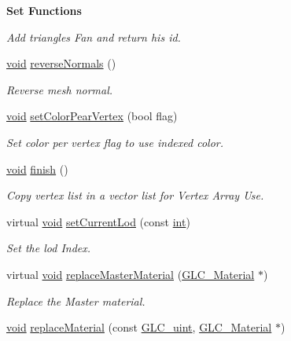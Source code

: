 \begin{Indent}{\bf Set Functions}
\begin{DoxyCompactItemize}
\begin{DoxyCompactList}\small\item\em Add triangles Fan and return his id. \end{DoxyCompactList}\item 
\hyperlink{group___u_a_v_objects_plugin_ga444cf2ff3f0ecbe028adce838d373f5c}{void} \hyperlink{class_g_l_c___mesh_a07f52a193f000496f654b7cecfaf40e9}{reverse\-Normals} ()
\begin{DoxyCompactList}\small\item\em Reverse mesh normal. \end{DoxyCompactList}\item 
\hyperlink{group___u_a_v_objects_plugin_ga444cf2ff3f0ecbe028adce838d373f5c}{void} \hyperlink{class_g_l_c___mesh_a2ddab431b4c0513f9183e74f57a67d25}{set\-Color\-Pear\-Vertex} (bool flag)
\begin{DoxyCompactList}\small\item\em Set color per vertex flag to use indexed color. \end{DoxyCompactList}\item 
\hyperlink{group___u_a_v_objects_plugin_ga444cf2ff3f0ecbe028adce838d373f5c}{void} \hyperlink{class_g_l_c___mesh_a1a542c61d4e0a84222304db9c4768b5b}{finish} ()
\begin{DoxyCompactList}\small\item\em Copy vertex list in a vector list for Vertex Array Use. \end{DoxyCompactList}\item 
virtual \hyperlink{group___u_a_v_objects_plugin_ga444cf2ff3f0ecbe028adce838d373f5c}{void} \hyperlink{class_g_l_c___mesh_ac1faab26c0b7b098bf4e9fa46d687c40}{set\-Current\-Lod} (const \hyperlink{ioapi_8h_a787fa3cf048117ba7123753c1e74fcd6}{int})
\begin{DoxyCompactList}\small\item\em Set the lod Index. \end{DoxyCompactList}\item 
virtual \hyperlink{group___u_a_v_objects_plugin_ga444cf2ff3f0ecbe028adce838d373f5c}{void} \hyperlink{class_g_l_c___mesh_af915ad15aeb24b4c75ed22b88fcb73bf}{replace\-Master\-Material} (\hyperlink{class_g_l_c___material}{G\-L\-C\-\_\-\-Material} $\ast$)
\begin{DoxyCompactList}\small\item\em Replace the Master material. \end{DoxyCompactList}\item 
\hyperlink{group___u_a_v_objects_plugin_ga444cf2ff3f0ecbe028adce838d373f5c}{void} \hyperlink{class_g_l_c___mesh_a42a6959bafcd7191e92dafb672b119b0}{replace\-Material} (const \hyperlink{glc__global_8h_abf950976fabed69026558df8e2da6c6b}{G\-L\-C\-\_\-uint}, \hyperlink{class_g_l_c___material}{G\-L\-C\-\_\-\-Material} $\ast$)

\end{DoxyCompactItemize}
\end{Indent}
